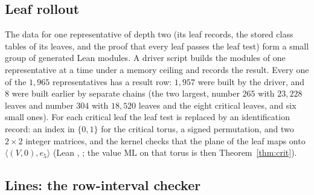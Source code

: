 \documentclass[11pt]{article}
\theoremstyle{remark}
\newcommand{\ML}{\mathrm{ML}}
\begin{document}
\subsection{Leaf rollout}\label{sec:rollout}

The data for one representative of depth two (its leaf records, the stored class tables of its leaves, and the proof that every leaf passes the leaf test) form a small group of generated Lean modules. A driver script builds the modules of one representative at a time under a memory ceiling and records the result. Every one of the $1{,}965$ representatives has a result row: $1{,}957$ were built by the driver, and $8$ were built earlier by separate chains (the two largest, number $265$ with $23{,}228$ leaves and number $304$ with $18{,}520$ leaves and the eight critical leaves, and six small ones).
For each critical leaf the leaf test is replaced by an identification record: an index in $\{0,1\}$ for the critical torus, a signed permutation, and two $2\times2$ integer matrices, and the kernel checks that the plane of the leaf maps onto $\langle(V,0),e_5\rangle$ (Lean , ; the value $\ML$ on that torus is then Theorem~\ref{thm:crit}).

\subsection{Lines: the row-interval checker}\label{sec:lines}
\end{document}
